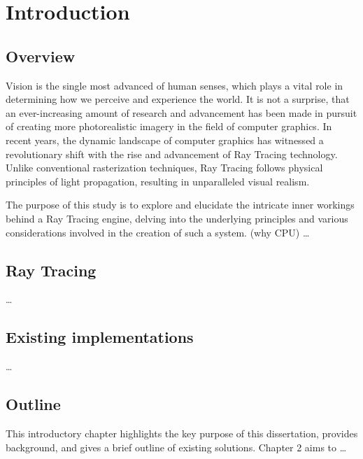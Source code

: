 \section{Introduction}

\subsection{Overview}

Vision is the single most advanced of human senses, which plays a vital role in determining how we perceive and experience the world.
It is not a surprise, that an ever-increasing amount of research and advancement has been made in pursuit of creating more photorealistic imagery in the field of computer graphics. 
In recent years, the dynamic landscape of computer graphics has witnessed a revolutionary shift with the rise and advancement of Ray Tracing technology. Unlike conventional rasterization techniques, Ray Tracing follows physical principles of light propagation, resulting in unparalleled visual realism. 

The purpose of this study is to explore and elucidate the intricate inner workings behind a Ray Tracing engine, delving into the underlying principles and various considerations involved in the creation of such a system.
(why CPU) \dots

\subsection{Ray Tracing}

\dots

\subsection{Existing implementations}

\dots

\subsection{Outline}

This introductory chapter highlights the key purpose of this dissertation, provides background, and gives a brief outline of existing solutions. 
Chapter 2 aims to \dots